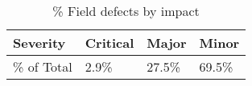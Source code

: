 \begin {table}
\begin{center}
\caption {\% Field defects by impact}
\begin{tabular}{| C{3cm} | C{3cm} | C{3cm} | C{3cm} |} \hline Severity & Critical & Major & Minor 
\\ \hline \% of Total  & 2.9\% & 27.5\% & 69.5\% 
\\ \hline
\end{tabular}
\end{center}
\label{tab:chap1tab1}
\end{table}